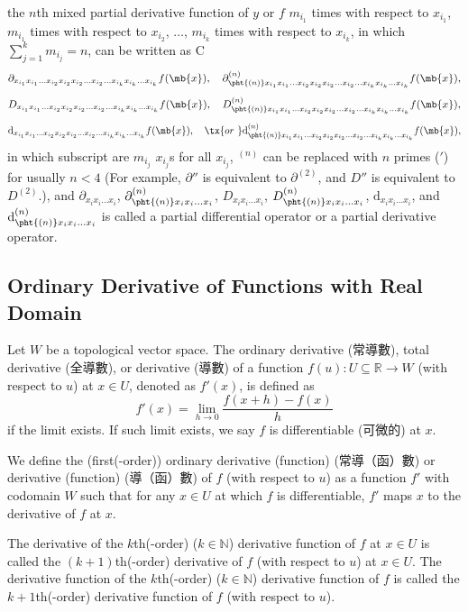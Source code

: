 \documentclass[a4paper,12pt]{report}
\begin{document}
\begin{itemize}
\begin{itemize}
the $n$th mixed partial derivative function of $y$ or $f$ $m_{i_1}$ times with respect to $x_{i_1}$, $m_{i_1}$ times with respect to $x_{i_2}$, $\dots $, $m_{i_k}$ times with respect to $x_{i_k}$, in which $\sum_{j=1}^km_{i_j}=n$, can be written as
C\[\partial_{x_{i_1}x_{i_1}\dots  x_{i_2}x_{i_2}x_{i_2}\dots  x_{i_2}\dots  x_{i_k}x_{i_k}\dots  x_{i_k}}f(\mb{x}),\quad\partial^{(n)}_{\pht{(n)}x_{i_1}x_{i_1}\dots  x_{i_2}x_{i_2}x_{i_2}\dots  x_{i_2}\dots  x_{i_k}x_{i_k}\dots  x_{i_k}}f(\mb{x}),\]
\[ D_{x_{i_1}x_{i_1}\dots  x_{i_2}x_{i_2}x_{i_2}\dots  x_{i_2}\dots  x_{i_k}x_{i_k}\dots  x_{i_k}}f(\mb{x}),\quad D^{(n)}_{\pht{(n)}x_{i_1}x_{i_1}\dots  x_{i_2}x_{i_2}x_{i_2}\dots  x_{i_2}\dots  x_{i_k}x_{i_k}\dots  x_{i_k}}f(\mb{x}),\]
\[ \mathrm{d}_{x_{i_1}x_{i_1}\dots  x_{i_2}x_{i_2}x_{i_2}\dots  x_{i_2}\dots  x_{i_k}x_{i_k}\dots  x_{i_k}}f(\mb{x}),\quad\tx{or\ }\mathrm{d}^{(n)}_{\pht{(n)}x_{i_1}x_{i_1}\dots  x_{i_2}x_{i_2}x_{i_2}\dots  x_{i_2}\dots  x_{i_k}x_{i_k}\dots  x_{i_k}}f(\mb{x}),\]
in which subscript are $m_{i_j}$ $x_{i_j}$s for all $x_{i_j}$, $^{(n)}$ can be replaced with $n$ primes ($'$) for usually $n<4$ (For example, $\partial''$ is equivalent to $\partial^{(2)}$, and $D''$ is equivalent to $D^{(2)}$.), and $\partial_{x_ix_i\dots  x_i}$, $\partial^{(n)}_{\pht{(n)}x_ix_i\dots  x_i}$, $D_{x_ix_i\dots  x_i}$, $D^{(n)}_{\pht{(n)}x_ix_i\dots  x_i}$, $\mathrm{d}_{x_ix_i\dots  x_i}$, and $\mathrm{d}^{(n)}_{\pht{(n)}x_ix_i\dots  x_i}$ is called a partial differential operator or a partial derivative operator.
\subsection{Ordinary Derivative of Functions with Real Domain}
Let $W$ be a topological vector space. The ordinary derivative (常導數), total derivative (全導數), or derivative (導數) of a function $f(u)\colon U\subseteq\mathbb{R}\to W$ (with respect to $u$) at $x\in U$, denoted as $f'(x)$, is defined as
\[f'(x)=\lim_{h\to 0}\frac{f(x+h)-f(x)}{h}\]
if the limit exists. If such limit exists, we say $f$ is differentiable (可微的) at $x$.

We define the (first(-order)) ordinary derivative (function) (常導（函）數) or derivative (function) (導（函）數) of $f$ (with respect to $u$) as a function $f'$ with codomain $W$ such that for any $x\in U$ at which $f$ is differentiable, $f'$ maps $x$ to the derivative of $f$ at $x$.

The derivative of the $k$th(-order) ($k\in\mathbb{N}$) derivative function of $f$ at $x\in U$ is called the $(k+1)$th(-order) derivative of $f$ (with respect to $u$) at $x\in U$. The derivative function of the $k$th(-order) ($k\in\mathbb{N}$) derivative function of $f$ is called the $k+1$th(-order) derivative function of $f$ (with respect to $u$).


\end{itemize}
\end{itemize}
\end{document}
